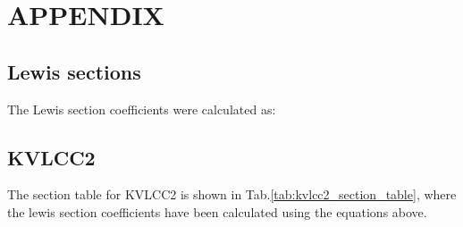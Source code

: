 \section*{APPENDIX}\label{appendix}

    \subsection*{Lewis sections}\label{lewis-sections}

    The Lewis section coefficients were calculated as:

    \subsection*{KVLCC2}\label{kvlcc2}

 The section table for KVLCC2 is shown in
Tab.\ref{tab:kvlcc2_section_table}, where the lewis section
coefficients have been calculated using the equations above.

    

    
